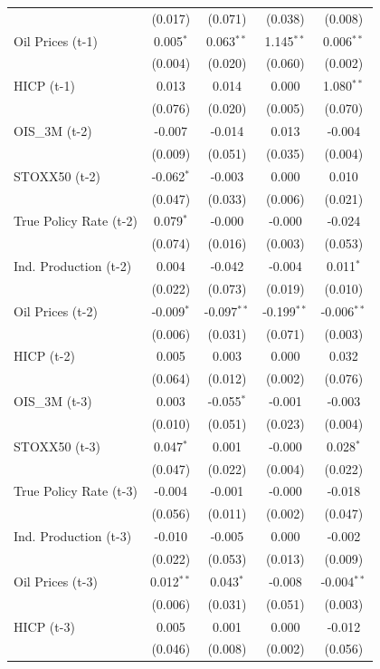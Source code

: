 \begin{longtable}[t]{lcccc}
 & (0.017) & (0.071) & (0.038) & (0.008)\\
Oil Prices (t-1) & 0.005$^{*}$ & 0.063$^{**}$ & 1.145$^{**}$ & 0.006$^{**}$\\
 & (0.004) & (0.020) & (0.060) & (0.002)\\
HICP (t-1) & 0.013 & 0.014 & 0.000 & 1.080$^{**}$\\
 & (0.076) & (0.020) & (0.005) & (0.070)\\
OIS\_3M (t-2) & -0.007 & -0.014 & 0.013 & -0.004\\
 & (0.009) & (0.051) & (0.035) & (0.004)\\
STOXX50 (t-2) & -0.062$^{*}$ & -0.003 & 0.000 & 0.010\\
 & (0.047) & (0.033) & (0.006) & (0.021)\\
True Policy Rate (t-2) & 0.079$^{*}$ & -0.000 & -0.000 & -0.024\\
 & (0.074) & (0.016) & (0.003) & (0.053)\\
Ind. Production (t-2) & 0.004 & -0.042 & -0.004 & 0.011$^{*}$\\
 & (0.022) & (0.073) & (0.019) & (0.010)\\
Oil Prices (t-2) & -0.009$^{*}$ & -0.097$^{**}$ & -0.199$^{**}$ & -0.006$^{**}$\\
 & (0.006) & (0.031) & (0.071) & (0.003)\\
HICP (t-2) & 0.005 & 0.003 & 0.000 & 0.032\\
 & (0.064) & (0.012) & (0.002) & (0.076)\\
OIS\_3M (t-3) & 0.003 & -0.055$^{*}$ & -0.001 & -0.003\\
 & (0.010) & (0.051) & (0.023) & (0.004)\\
STOXX50 (t-3) & 0.047$^{*}$ & 0.001 & -0.000 & 0.028$^{*}$\\
 & (0.047) & (0.022) & (0.004) & (0.022)\\
True Policy Rate (t-3) & -0.004 & -0.001 & -0.000 & -0.018\\
 & (0.056) & (0.011) & (0.002) & (0.047)\\
Ind. Production (t-3) & -0.010 & -0.005 & 0.000 & -0.002\\
 & (0.022) & (0.053) & (0.013) & (0.009)\\
Oil Prices (t-3) & 0.012$^{**}$ & 0.043$^{*}$ & -0.008 & -0.004$^{**}$\\
 & (0.006) & (0.031) & (0.051) & (0.003)\\
HICP (t-3) & 0.005 & 0.001 & 0.000 & -0.012\\
 & (0.046) & (0.008) & (0.002) & (0.056)\\

\end{longtable}
